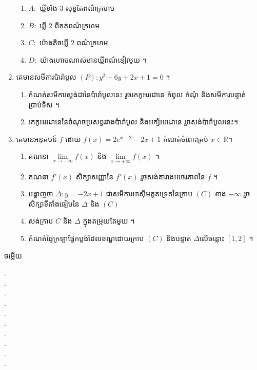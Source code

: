 \documentclass[a4paper, 11pt]{exam}
\begin{document}
\begin{enumerate}[I]
	\begin{enumerate}[a]
		\item $A:$ ឃ្លីទាំង $3$ សុទ្ធតែពណ៌ក្រហម
		\item $B:$ ឃ្លី $2$ ពីគត់ពណ៌ក្រហម 
		\item $C:$ យ៉ាងតិចឃ្លី $2$ ពណ៌ក្រហម
		\item $D:$ យ៉ាងហោចណាស់មានឃ្លីពណ៌ខៀវមួយ ។ 
	\end{enumerate}
	\item គេមានសមីការប៉ារ៉ាបូល $(P): y^2-6y+2x+1=0$ ។
	\begin{enumerate}[a]
		\item កំណត់សមីការស្តង់ដានៃប៉ារ៉ាបូលនេះ រួចរកកូអរដោនេ កំពូល កំណុំ និងសមីការបន្ទាត់ប្រាប់ទិស ។
		\item រកកូអរដោនេនៃចំណុចប្រសព្វរវាងប៉ារ៉ាបូល និងអក្ស័អរដោនេ រួចសង់ប៉ារ៉ាបូលនេះ​ ។ 
	\end{enumerate}
	\item គេមានអនុគមន៍ $f$ ដោយ $f(x) = 2e^{x-2}-2x+1$ កំណត់ចំពោះគ្រប់ $x\in\mathbb{R}$​។
	\begin{enumerate}[a]
		\item គណនា $\lim\limits_{x\to-\infty} f(x)$ និង $\lim\limits_{x\to+\infty} f(x)$ ។
		\item គណនា $f'(x)$ សិក្សាសញ្ញានៃ $f'(x)$ រួចសង់តារាងអថេរភាពនៃ $f$ ។
		\item បង្ហាញថា $\Delta:​y=-2x+1$ ជាសមីការអាស៊ីមតូតទ្រេតនៃក្រាប $(C)$ ខាង $-\infty$ រួចសិក្សាទីតាំងធៀបនៃ $\Delta$ និង $(C)$
		\item សង់ក្រាប $C$ និង $\Delta$ ក្នុងតម្រុយតែមួយ ។
		\item កំណត់ផ្ទៃក្រឡាផ្នែកប្លង់ដែលខណ្ឌដោយក្រាប $(C)$ និងបន្ទាត់ $\Delta$​លើចន្លោះ $[1,2]$ ។
	\end{enumerate}
\end{enumerate}
\begin{center}
	\sffamily\color{black}
	ចម្លើយ
\end{center}
{\color{white}.}\dotfill\\
{\color{white}.}\dotfill\\
{\color{white}.}\dotfill
\\
{\color{white}.}\dotfill\\
{\color{white}.}\dotfill\\
{\color{white}.}\dotfill
\\
{\color{white}.}\dotfill\\
{\color{white}.}\dotfill\\
{\color{white}.}\dotfill
\\
{\color{white}.}\dotfill\\
\end{document}
